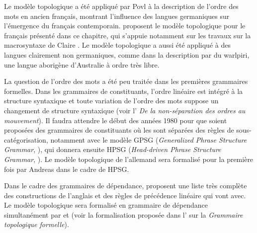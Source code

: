 {    Le modèle topologique a été appliqué par Povl \citet{skaarup1975premieres} à la description de l’ordre des mots en ancien français, montrant l’influence des langues germaniques sur l’émergence du français contemporain. \citet{gerdes2006amas} proposent le modèle topologique pour le français présenté dans ce chapitre, qui s’appuie notamment sur les travaux sur la macrosyntaxe de Claire \citet{blanche-benveniste1990francais}. Le modèle topologique a aussi été appliqué à des langues clairement non germaniques, comme dans la description par \citet{DonohueSag1999} du warlpiri, une langue aborigène d’Australie à ordre très libre.

    La question de l’ordre des mots a été peu traitée dans les premières grammaires formelles. Dans les grammaires de constituants, l’ordre linéaire est intégré à la structure syntaxique et toute variation de l’ordre des mots suppose un changement de structure syntaxique (voir l’ \textit{De la non-séparation des ordres au mouvement}). Il faudra attendre le début des années 1980 pour que soient proposées des grammaires de constituants où les  sont séparées des règles de sous-catégorisation, notamment avec le modèle GPSG (\textit{Generalized Phrase Structure Grammar}, \citealt{gazdar1985generalized}), qui donnera ensuite HPSG (\textit{Head-driven Phrase Structure Grammar}, \citealt{PollardSag1987}). Le modèle topologique de l’allemand sera formalisé pour la première fois par Andreas \citet{kathol1995linearization-based} dans le cadre de HPSG.

    Dans le cadre des grammaires de dépendance, \citet{melcuk1987surface} proposent une liste très complète des constructions de l’anglais et des règles de précédence linéaire qui vont avec. Le modèle topologique sera formalisé en grammaire de dépendance simultanément par \citet{duchier2001topological} et \citet{gerdes2001word} (voir la formalisation proposée dans l’ sur la \textit{Grammaire topologique formelle}).
}
